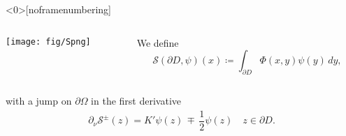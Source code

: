 \documentclass[10pt,xcolor={dvipsnames}]{beamer}
\theoremstyle{plain}
\theoremstyle{plain}
\begin{document}
\begin{frame}<0>[noframenumbering]
\begin{columns}[T]
  \begin{column}{0.50\textwidth}
  \texttt{[image: fig/Spng]}
  \end{column}
  \begin{column}{0.50\textwidth}
  \vspace{2cm}
  We define
   \begin{equation*}
    \mathcal{S}(\partial D,\psi)(x)\coloneqq \int_{\partial D} \Phi(x, y)\psi(y)\, dy,
    \label{eq:definition-single-layer}
   \end{equation*}
  \end{column}
 \end{columns}
 \vspace{0.1cm}
   with a jump on $\partial\Omega$ in the first derivative
  \begin{align*}
   \partial_\nu\mathcal{S}^\pm(z) =  K'\psi(z) \,\mp\,\dfrac{1}{2}\psi(z) \quad z\in\partial D.\label{eq:single-pm-1}
  \end{align*}

 \end{frame}
\end{document}
